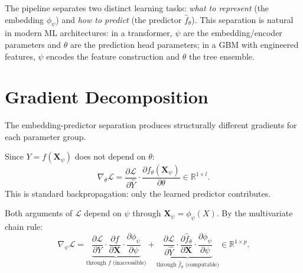 The pipeline separates two distinct learning tasks: \emph{what to represent} (the embedding $\phi_\psi$) and \emph{how to predict} (the predictor $\hat{f}_\theta$). This separation is natural in modern ML architectures: in a transformer, $\psi$ are the embedding/encoder parameters and $\theta$ are the prediction head parameters; in a GBM with engineered features, $\psi$ encodes the feature construction and $\theta$ the tree ensemble.


\section{Gradient Decomposition}
\label{sec:gradient-decomp}

The embedding-predictor separation produces structurally different gradients for each parameter group.

\begin{proposition}
\label{prop:theta-grad}
Since $Y = f(\mathbf{X}_\psi)$ does not depend on $\theta$:
\begin{equation}
\label{eq:theta-grad}
    \nabla_\theta \mathcal{L} = \frac{\partial \mathcal{L}}{\partial \hat{Y}} \cdot \frac{\partial \hat{f}_\theta(\mathbf{X}_\psi)}{\partial \theta} \in \mathbb{R}^{1 \times l}.
\end{equation}
This is standard backpropagation: only the learned predictor contributes.
\end{proposition}

\begin{proposition}
\label{prop:psi-grad}
Both arguments of $\mathcal{L}$ depend on $\psi$ through $\mathbf{X}_\psi = \phi_\psi(X)$. By the multivariate chain rule:
\begin{equation}
\label{eq:psi-grad}
\boxed{
    \nabla_\psi \mathcal{L} = \underbrace{\frac{\partial \mathcal{L}}{\partial Y} \cdot \frac{\partial f}{\partial \mathbf{X}} \cdot \frac{\partial \phi_\psi}{\partial \psi}}_{\text{through } f \text{ (inaccessible)}} + \underbrace{\frac{\partial \mathcal{L}}{\partial \hat{Y}} \cdot \frac{\partial \hat{f}_\theta}{\partial \mathbf{X}} \cdot \frac{\partial \phi_\psi}{\partial \psi}}_{\text{through } \hat{f}_\theta \text{ (computable)}} \in \mathbb{R}^{1 \times p}.
}
\end{equation}
\end{proposition}

